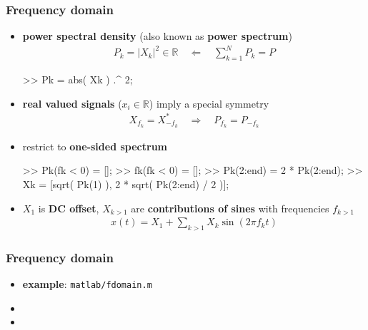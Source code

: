 \begin{frame}[fragile] %
	\frametitle{Frequency domain}
	\begin{itemize}
		\item \textbf{power spectral density} (also known as \textbf{power spectrum})
			\begin{align*}
				P_k=\lvert X_k\rvert^2\in\mathbb R\quad\Leftarrow\quad\sum_{k=1}^NP_k=P
			\end{align*}
			\begin{code}
>> Pk = abs( Xk ) .^ 2; \color{medium}%
			\end{code}
		\item \textbf{real valued signals} ($x_i\in\mathbb R$) imply a special symmetry
			\begin{align*}
				X_{f_k}=X_{-f_k}^*\quad\Rightarrow\quad P_{f_k}=P_{-f_k}
			\end{align*}
		\item restrict to \textbf{one-sided spectrum}
			\begin{code}
>> Pk(fk < 0) = []; \color{medium}%
>> fk(fk < 0) = [];
>> Pk(2:end) = 2 * Pk(2:end); \color{medium}%
>> Xk = [sqrt( Pk(1) ), 2 * sqrt( Pk(2:end) / 2 )];
			\end{code}
		\item $X_1$ is \textbf{DC offset}, $X_{k>1}$ are \textbf{contributions of sines} with frequencies $f_{k>1}$
			\begin{align*}
				x(t)=X_1+\sum_{k>1}X_k\sin(2\pi f_kt)
			\end{align*}
	\end{itemize}
\end{frame}

\begin{frame} %
	\frametitle{Frequency domain}
	\begin{itemize}
		\item \textbf{example}: \texttt{matlab/fdomain.m}
			\begin{figure}
				\centering
				\begin{subfigure}[c]{0.48\linewidth}
				\end{subfigure}
				\hspace{0.01\linewidth}
				\begin{subfigure}[c]{0.48\linewidth}
				\end{subfigure}
			\end{figure}
		\item {}
		\item {}
	\end{itemize}
\end{frame}

